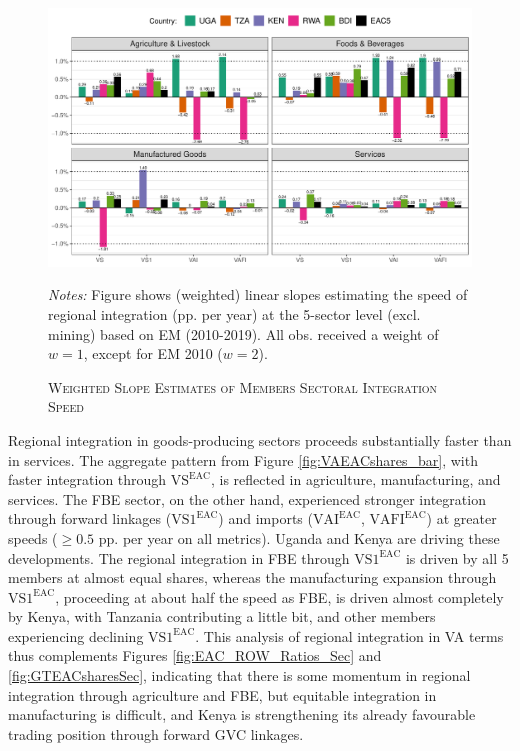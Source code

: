 \documentclass[a4paper]{article}
\begin{document}
\begin{figure}[h!] 
\centering
\caption{\label{fig:VAEACshares_bar_sec}\textsc{Weighted Slope Estimates of Members Sectoral Integration Speed}}
\includegraphics[width=1\textwidth, trim= {0 0 0 0}, clip]{"Figures/EM_VA_EAC5_shares_slope_bar_sec.pdf"} \\ \raggedright
\scriptsize
\emph{Notes:} Figure shows (weighted) linear slopes estimating the speed of regional integration (pp. per year) at the 5-sector level (excl. mining) based on EM (2010-2019). All obs. received a weight of $w=1$, except for EM 2010 ($w=2$).  
\end{figure}
\FloatBarrier

Regional integration in goods-producing sectors proceeds substantially faster than in services. The aggregate pattern from Figure \ref{fig:VAEACshares_bar}, with faster integration through $\text{VS}^\text{EAC}$, is reflected in agriculture, manufacturing, and services. The FBE sector, on the other hand, experienced stronger integration through forward linkages ($\text{VS1}^\text{EAC}$) and imports ($\text{VAI}^\text{EAC}$, $\text{VAFI}^\text{EAC}$) at greater speeds ($\geq 0.5$ pp. per year on all metrics). Uganda and Kenya are driving these developments. The regional integration in FBE through $\text{VS1}^\text{EAC}$ is driven by all 5 members at almost equal shares, whereas the manufacturing expansion through $\text{VS1}^\text{EAC}$, proceeding at about half the speed as FBE, is driven almost completely by Kenya, with Tanzania contributing a little bit, and other members experiencing declining $\text{VS1}^\text{EAC}$. This analysis of regional integration in VA terms thus complements Figures \ref{fig:EAC_ROW_Ratios_Sec} and \ref{fig:GTEACsharesSec}, indicating that there is some momentum in regional integration through agriculture and FBE, but equitable integration in manufacturing is difficult, and Kenya is strengthening its already favourable trading position through forward GVC linkages. 
\end{document}

